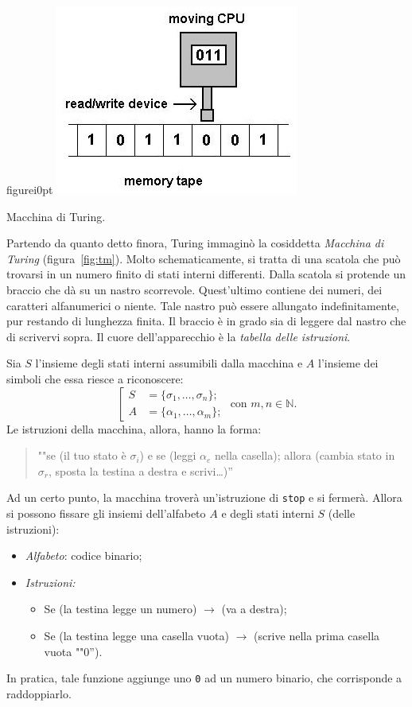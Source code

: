 \begin{wrapfloat}{figure}{i}{0pt}
	\centering
	\includegraphics[width=0.5\columnwidth]{immagini/turing}
	\caption{Macchina di Turing.}
	\label{fig:tm}
\end{wrapfloat}
Partendo  da quanto detto finora, Turing immaginò la cosiddetta \emph{Macchina di Turing} (figura~\vref{fig:tm}). Molto schematicamente, si tratta di una scatola che può trovarsi in un numero finito di stati interni differenti. Dalla scatola si protende un braccio che dà su un nastro scorrevole. Quest'ultimo contiene dei numeri, dei caratteri alfanumerici o niente. Tale nastro può essere allungato indefinitamente, pur restando di lunghezza finita. Il braccio è in grado sia di leggere dal nastro che di scrivervi sopra. Il cuore dell'apparecchio è la \emph{tabella delle istruzioni}.

Sia $S$ l'insieme degli stati interni assumibili dalla macchina e $A$ l'insieme dei simboli che essa riesce a riconoscere:
\[
\left[
	\begin{aligned}
S &= \{ \sigma_1, \dots, \sigma_n \}; \\
A &= \{ \alpha_1, \dots, \alpha_m \};
	\end{aligned}
\right.
\text{ con } m,n \in \mathbb{N}.
\]
Le istruzioni della macchina, allora, hanno la forma:
\begin{quote}
""se (il tuo stato è $\sigma_i$) e se (leggi $\alpha_e$ nella casella); allora (cambia stato in $\sigma_r$, sposta la testina a destra e scrivi\dots)''
\end{quote}
Ad un certo punto, la macchina troverà un'istruzione di \lstinline!stop! e si fermerà. Allora si possono fissare gli insiemi dell'alfabeto $A$ e degli stati interni $S$ (delle istruzioni):
\begin{itemize}
	\item
\emph{Alfabeto}: codice binario;
	\item
\emph{Istruzioni:}
		\begin{itemize}
			\item
Se (la testina legge un numero) $\rightarrow$ (va a destra);
			\item
Se (la testina legge una casella vuota) $\rightarrow$ (scrive nella prima casella vuota ""$0$'').
		\end{itemize}
\end{itemize}
In pratica, tale funzione aggiunge uno \lstinline!0! ad un numero binario, che corrisponde a raddoppiarlo.

